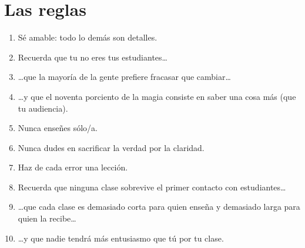 \chapter*{Las reglas}

\begin{enumerate}

\item Sé amable: todo lo demás son detalles.\\

\item Recuerda que tu no eres tus estudiantes{\ldots}\\

\item {\ldots}que la mayoría de la gente prefiere fracasar que cambiar{\ldots}\\

\item {\ldots}y que el noventa porciento de la magia consiste en saber una cosa más (que tu audiencia).\\

\item Nunca enseñes sólo/a.\\

\item Nunca dudes en sacrificar la verdad por la claridad.\\

\item Haz de cada error una lección.\\

\item Recuerda que ninguna clase sobrevive el primer contacto con estudiantes{\ldots}\\

\item {\ldots}que cada clase es demasiado corta para quien enseña y demasiado larga para quien la recibe{\ldots}\\

\item {\ldots}y que nadie tendrá más entusiasmo que tú por tu clase.

\end{enumerate}

